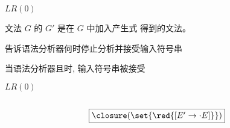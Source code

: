 \begin{frame}{}
  \begin{center}
    $LR(0)$ 

  \end{center}
\end{frame}

\begin{frame}{}
  \begin{center}
    \begin{definition}
      文法 $G$ 的 $G'$ 是在 $G$ 中加入产生式  得到的文法。
    \end{definition}

    \vspace{0.50cm}
     告诉语法分析器何时停止分析并接受输入符号串

    \vspace{0.80cm}
    当语法分析器且时, 输入符号串被接受
  \end{center}
\end{frame}

\begin{frame}{}
  \begin{center}
    $LR(0)$ 

    \vspace{0.30cm}

    \vspace{0.30cm}
  \end{center}
\end{frame}

\begin{frame}{}
  \begin{center}

    \begin{columns}
        
    \end{columns}

    \[
      \fbox{$\closure(\set{\red{[E' \to \cdot E]}})$}
    \]
  \end{center}
\end{frame}

